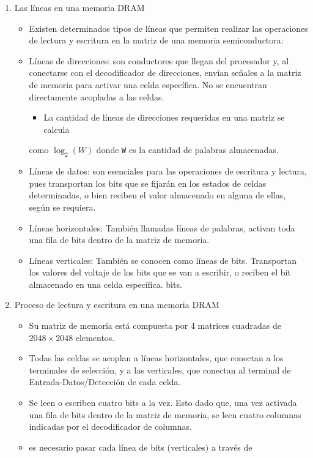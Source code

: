 \documentclass{article}
\begin{document}
\begin{enumerate}
\item Las líneas en una memoria DRAM
\label{sec:orgc8e8059}
\begin{itemize}
\item Existen determinados tipos de líneas que permiten realizar las
operaciones de lectura y escritura en la matriz de una memoria
semiconductora:
\item Líneas de direcciones:  son conductores que llegan del procesador
y, al conectarse con el decodificador de direcciones, envían señales
a la matriz de memoria para activar una celda específica. No se
encuentran directamente acopladas a las celdas.
\begin{itemize}
\item La cantidad de líneas de direcciones requeridas en una matriz se calcula
\end{itemize}
como \(\log_2(W)\) donde \texttt{W} es la cantidad de palabras almacenadas.
\item Líneas de datos: son esenciales para las operaciones de escritura
y lectura, pues transportan los bits que se fijarán en los estados
de celdas determinadas, o bien reciben el valor almacenado en alguna
de ellas, según se requiera.
\item Líneas horizontales:  También llamadas líneas de palabras, activan
toda una fila de bits dentro de la matriz de memoria.
\item Líneas verticales:  También se conocen como líneas de bits. Transportan los valores del voltaje de los bits que se van a escribir, o reciben el bit almacenado en una celda específica.
bits.
\end{itemize}
\item Proceso de lectura y escritura en una memoria DRAM
\label{sec:org1a45771}
\begin{itemize}
\item Su matriz de memoria está compuesta por 4 matrices cuadradas de
\(2048 \times 2048\) elementos.
\item Todas las celdas se acoplan a líneas horizontales, que conectan a los
terminales de selección, y a las verticales, que conectan al terminal de
Entrada-Datos/Detección de cada celda.
\item Se leen o escriben cuatro bits a la vez. Esto dado que, una vez
activada una fila de bits dentro de la matriz de memoria, se leen
cuatro columnas indicadas por el decodificador de columnas.
\item[{Para la lectura}] es necesario pasar cada línea de bits (verticales) a través de

\end{itemize}
\end{enumerate}
\end{document}
